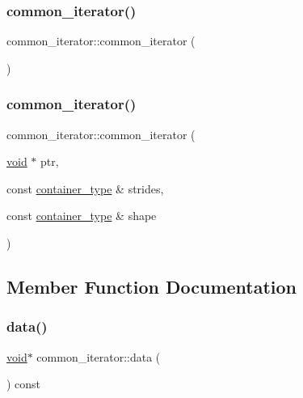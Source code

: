 \subsubsection{\texorpdfstring{common\_iterator()}{common\_iterator()}\hspace{0.1cm}{\footnotesize\ttfamily [1/2]}}
{\footnotesize\ttfamily common\+\_\+iterator\+::common\+\_\+iterator (\begin{DoxyParamCaption}{ }\end{DoxyParamCaption})\hspace{0.3cm}{\ttfamily [inline]}}

\mbox{\label{classcommon__iterator_a5bb0f4465ff31b46f77188fe253ade67}} 
\subsubsection{\texorpdfstring{common\_iterator()}{common\_iterator()}\hspace{0.1cm}{\footnotesize\ttfamily [2/2]}}
{\footnotesize\ttfamily common\+\_\+iterator\+::common\+\_\+iterator (\begin{DoxyParamCaption}\item[{\mbox{\hyperlink{_s_d_l__opengles2__gl2ext_8h_ae5d8fa23ad07c48bb609509eae494c95}{void}} $\ast$}]{ptr,  }\item[{const \mbox{\hyperlink{classcommon__iterator_a61d77b64fb74c43f016ce8cbde4b27c7}{container\+\_\+type}} \&}]{strides,  }\item[{const \mbox{\hyperlink{classcommon__iterator_a61d77b64fb74c43f016ce8cbde4b27c7}{container\+\_\+type}} \&}]{shape }\end{DoxyParamCaption})\hspace{0.3cm}{\ttfamily [inline]}}



\subsection{Member Function Documentation}
\mbox{\label{classcommon__iterator_a29db8ccd525c10275c1cbcab64c56b95}} 
\subsubsection{\texorpdfstring{data()}{data()}}
{\footnotesize\ttfamily \mbox{\hyperlink{_s_d_l__opengles2__gl2ext_8h_ae5d8fa23ad07c48bb609509eae494c95}{void}}$\ast$ common\+\_\+iterator\+::data (\begin{DoxyParamCaption}{ }\end{DoxyParamCaption}) const\hspace{0.3cm}{\ttfamily [inline]}}


